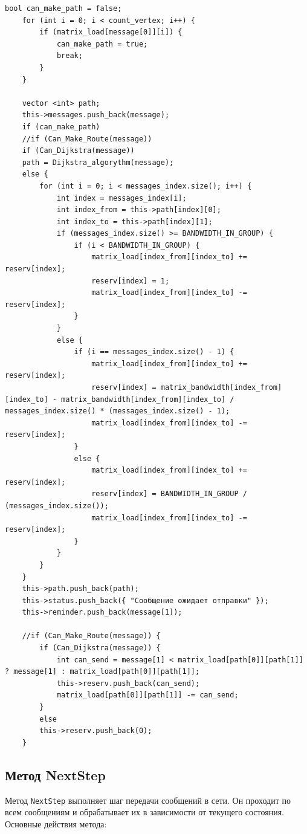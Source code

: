 \documentclass[11pt,a4paper,final]{article} %
\begin{document}
\begin{lstlisting}[label=lst3, caption = {Добавление нового сообщения}]
	bool can_make_path = false;
	for (int i = 0; i < count_vertex; i++) {
		if (matrix_load[message[0]][i]) {
			can_make_path = true;
			break;
		}
	}
	
	vector <int> path;
	this->messages.push_back(message);
	if (can_make_path)
	//if (Can_Make_Route(message))
	if (Can_Dijkstra(message))
	path = Dijkstra_algorythm(message);
	else {
		for (int i = 0; i < messages_index.size(); i++) {
			int index = messages_index[i];
			int index_from = this->path[index][0];
			int index_to = this->path[index][1];
			if (messages_index.size() >= BANDWIDTH_IN_GROUP) {
				if (i < BANDWIDTH_IN_GROUP) {
					matrix_load[index_from][index_to] += reserv[index];
					reserv[index] = 1;
					matrix_load[index_from][index_to] -= reserv[index];
				}
			}
			else {
				if (i == messages_index.size() - 1) {
					matrix_load[index_from][index_to] += reserv[index];
					reserv[index] = matrix_bandwidth[index_from][index_to] - matrix_bandwidth[index_from][index_to] / messages_index.size() * (messages_index.size() - 1);
					matrix_load[index_from][index_to] -= reserv[index];
				}
				else {
					matrix_load[index_from][index_to] += reserv[index];
					reserv[index] = BANDWIDTH_IN_GROUP / (messages_index.size());
					matrix_load[index_from][index_to] -= reserv[index];
				}
			}
		}
	}
	this->path.push_back(path);
	this->status.push_back({ "Сообщение ожидает отправки" });
	this->reminder.push_back(message[1]);
	
	//if (Can_Make_Route(message)) {
		if (Can_Dijkstra(message)) {
			int can_send = message[1] < matrix_load[path[0]][path[1]] ? message[1] : matrix_load[path[0]][path[1]];
			this->reserv.push_back(can_send);
			matrix_load[path[0]][path[1]] -= can_send;
		}
		else
		this->reserv.push_back(0);
	}
\end{lstlisting}


\subsection{Метод NextStep}

Метод \texttt{NextStep} выполняет шаг передачи сообщений в сети. Он проходит по всем сообщениям и обрабатывает их в зависимости от текущего состояния. Основные действия метода:
\end{document}
